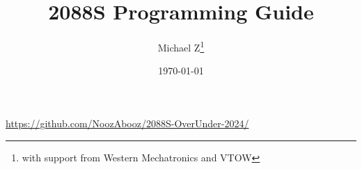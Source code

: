 \documentclass[12pt, letterpaper]{article}
\title{\textbf{2088S Programming Guide}}
\author{Michael Z\thanks{with support from Western Mechatronics and VTOW}}
\date{\today}
\begin{document}
\maketitle

\begin{centering}
\url{https://github.com/NoozAbooz/2088S-OverUnder-2024/}\\
\end{centering}
\newpage

\tableofcontents

\end{document}
